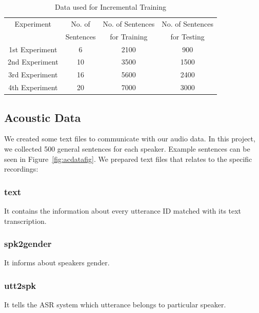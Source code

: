 \documentclass[conference]{IEEEtran}
\begin{document}
\begin{table}[ht]
\caption{Data used for Incremental Training} %
\centering %
\setlength\tabcolsep{1.5pt} %
\begin{tabular}{c c c c} %
\hline %
Experiment & No. of & No. of Sentences & No. of Sentences \\  %
  & Sentences & for Training & for Testing  \\
\hline %


1st Experiment &  6 & 2100 & 900\\
2nd Experiment &  10 & 3500 & 1500\\
3rd Experiment &  16 & 5600 & 2400\\ %
4th Experiment &  20 & 7000 & 3000\\[1ex] %
\hline %
\end{tabular}
\label{table:audioData} %
\end{table}


\subsection {Acoustic Data}
\label{subsec:AcousticData}
We created some text files to communicate with our audio data. In this project, we collected 500 general sentences for each speaker. Example sentences can be seen in Figure~\ref{fig:acdatafig}. We prepared text files that relates to the specific recordings:

\subsubsection{text}
\label{subsec:text}
It contains the information about every utterance ID matched with its text transcription.

\subsubsection{spk2gender}
\label{subsec:spk2gender}
It informs about speakers gender.

\subsubsection{utt2spk}
\label{subsec:utt2spk}
It tells the ASR system which utterance belongs to particular speaker.
\end{document}

